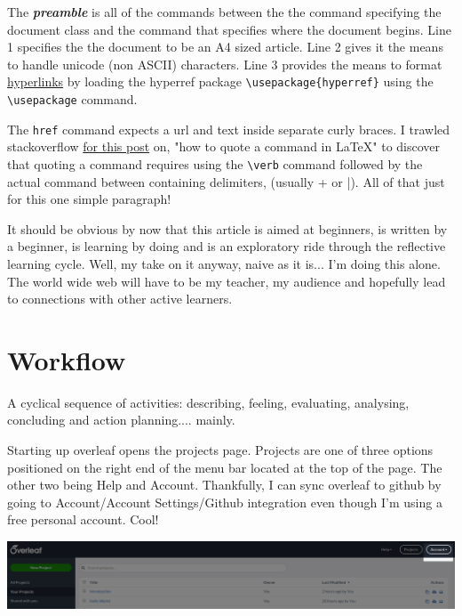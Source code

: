 \documentclass[a4paper]{article}
\begin{document}
The \textbf{\emph{preamble}} is all of the commands between the the command specifying the document class and the command that specifies where the document begins. Line 1 specifies the the document to be an A4 sized article. Line 2 gives it the means to handle unicode (non ASCII) characters. Line 3 provides the means to format \href{https://en.wikibooks.org/wiki/LaTeX/Hyperlinks}{hyperlinks} by loading the hyperref package \verb+\usepackage{hyperref}+ using the \verb+\usepackage+ command. 

The \verb+href+ command expects a url and text inside separate curly braces. I trawled stackoverflow  \href{https://stackoverflow.com/questions/30421368/latex-how-to-quote-command}{for this post} on, "how to quote a command in LaTeX" to discover that quoting a command requires using the \verb+\verb+ command followed by the actual command between containing delimiters, (usually + or |). All of that just for this one simple paragraph! 

It should be obvious by now that this article is aimed at beginners, is written by a beginner, is learning by doing and is an exploratory ride through the reflective learning cycle. Well, my take on it anyway, naive as it is... I'm doing this alone. The world wide web will have to be my teacher, my audience and hopefully lead to connections with other active learners.

\section{Workflow}
A cyclical sequence of activities: describing, feeling, evaluating, analysing, concluding and action planning.... mainly.

Starting up overleaf opens the projects page. Projects are one of three options positioned on the right end of the menu bar located at the top of the page. The other two being Help and Account. Thankfully, I can sync overleaf to github by going to Account/Account Settings/Github integration even though I'm using a free personal account. Cool!

\noindent
\includegraphics[width=\linewidth]{overleafmenubar.png}



\end{document}

